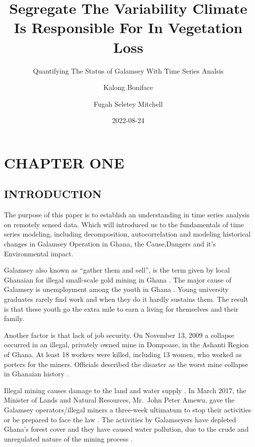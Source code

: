 \documentclass[
  letterpaper,
  DIV=11,
  numbers=noendperiod]{scrartcl}
\title{Segregate The Variability Climate Is Responsible For In
Vegetation Loss}
\subtitle{Quantifying The Status of Galamsey With Time Series Analsis}
\author{Kalong Boniface \and Fugah Seletey Mitchell}
\date{2022-08-24}
\renewcommand*\contentsname{Table of contents}
\newcommand\contentsname{Table of contents}
\begin{document}
\maketitle
\ifdefined\Shaded\renewenvironment{Shaded}{\begin{tcolorbox}[frame hidden, sharp corners, enhanced, interior hidden, borderline west={3pt}{0pt}{shadecolor}, boxrule=0pt, breakable]}{\end{tcolorbox}}\fi

\renewcommand*\contentsname{Table of Contents}
{
\hypersetup{linkcolor=}
\setcounter{tocdepth}{2}
\tableofcontents
}
\hypertarget{chapter-one}{%
\section{CHAPTER ONE}\label{chapter-one}}

\hypertarget{introduction}{%
\subsection{INTRODUCTION}\label{introduction}}

The purpose of this paper is to establish an understanding in time
series analysis on remotely sensed data. Which will introduced us to the
fundamentals of time series modeling, including decomposition,
autocorrelation and modeling historical changes in Galamsey Operation in
Ghana, the Cause,Dangers and it's Environmental impact.

Galamsey also known as ``gather them and
sell'',\autocite{owusu-nimo2018} is the term given by local Ghanaian for
illegal small-scale gold mining in Ghana . The major cause of Galamsey
is unemployment among the youth in Ghana \autocite{gracia2018}. Young
university graduates rarely find work and when they do it hardly
sustains them. The result is that these youth go the extra mile to earn
a living for themselves and their family.

Another factor is that lack of job security. On November 13, 2009 a
collapse occurred in an illegal, privately owned mine in Dompoase, in
the Ashanti Region of Ghana. At least 18 workers were killed, including
13 women, who worked as porters for the miners. Officials described the
disaster as the worst mine collapse in Ghanaian history
\autocite{womendi2009} .

Illegal mining causes damage to the land and water supply
\autocite{ansah2017} . In March 2017, the Minister of Lands and Natural
Resources, Mr.~John Peter Amewu, gave the Galamsey operators/illegal
miners a three-week ultimatum to stop their activities or be prepared to
face the law \autocite{allotey2017} . The activities by Galamseyers have
depleted Ghana's forest cover and they have caused water pollution, due
to the crude and unregulated nature of the mining process
\autocite{gyekye} .
\end{document}
